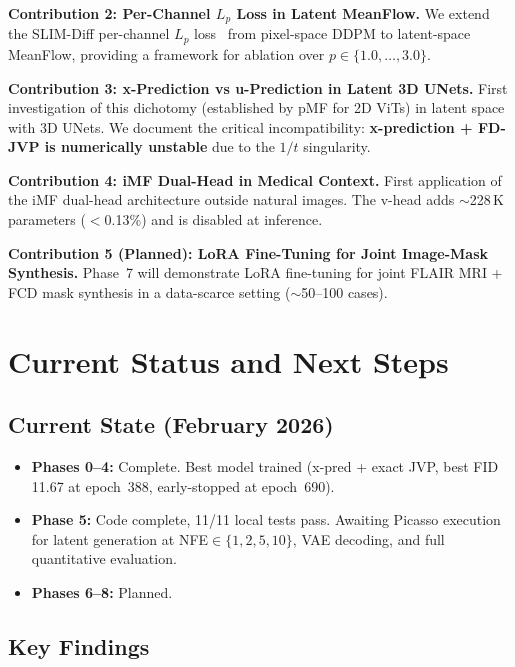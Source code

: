 \documentclass[11pt,a4paper]{article}
\begin{document}
\textbf{Contribution 2: Per-Channel $L_p$ Loss in Latent MeanFlow.}
We extend the SLIM-Diff per-channel $L_p$ loss~\cite{slimdiff} from
pixel-space DDPM to latent-space MeanFlow, providing a framework for
ablation over $p \in \{1.0,\ldots,3.0\}$.

\textbf{Contribution 3: x-Prediction vs u-Prediction in Latent 3D UNets.}
First investigation of this dichotomy (established by pMF for 2D ViTs) in
latent space with 3D UNets.  We document the critical incompatibility:
\textbf{x-prediction + FD-JVP is numerically unstable} due to the $1/t$
singularity.

\textbf{Contribution 4: iMF Dual-Head in Medical Context.}
First application of the iMF dual-head architecture outside natural images.
The v-head adds ${\sim}$228\,K parameters ($<$0.13\%) and is disabled at
inference.

\textbf{Contribution 5 (Planned): LoRA Fine-Tuning for Joint Image-Mask
Synthesis.}  Phase~7 will demonstrate LoRA fine-tuning for joint FLAIR MRI +
FCD mask synthesis in a data-scarce setting (${\sim}$50--100 cases).


\section{Current Status and Next Steps}
\label{sec:status}

\subsection{Current State (February 2026)}

\begin{itemize}[nosep]
  \item \textbf{Phases 0--4:} Complete. Best model trained (x-pred + exact JVP,
    best FID 11.67 at epoch~388, early-stopped at epoch~690).
  \item \textbf{Phase 5:} Code complete, 11/11 local tests pass.  Awaiting
    Picasso execution for latent generation at NFE$\in\{1,2,5,10\}$, VAE
    decoding, and full quantitative evaluation.
  \item \textbf{Phases 6--8:} Planned.
\end{itemize}

\subsection{Key Findings}
\end{document}
